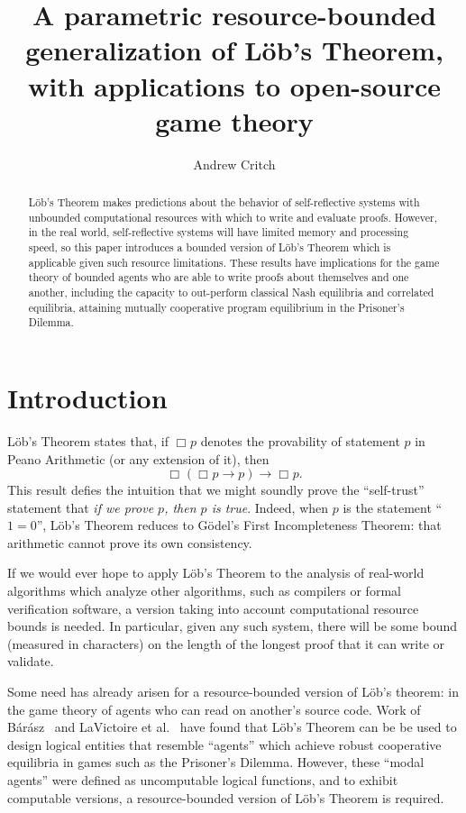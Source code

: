 \documentclass[jsl,reqno,bibay2]{asl}
\title[A parametric resource-bounded generalization of L\"{o}b's Theorem]{A parametric resource-bounded generalization of L\"{o}b's Theorem, with applications to open-source game theory}
\author{Andrew Critch}
\numberwithin{equation}{section}
\theoremstyle{definition}
\newcommand{\bx}[1]{\Box_{#1}}
\renewcommand{\implies}{\rightarrow}
\renewcommand{\-}{^{-1}}
\begin{document}
\begin{abstract}
L\"{o}b's Theorem makes predictions about the behavior of self-reflective systems with unbounded computational resources with which to write and evaluate proofs.  However, in the real world, self-reflective systems will have limited memory and processing speed, so this paper introduces a bounded version of L\"{o}b's Theorem which is applicable given such resource limitations.  
These results have implications for the game theory of bounded agents who are able to write proofs about themselves and one another, including the capacity to out-perform classical Nash equilibria and correlated equilibria, attaining mutually cooperative program equilibrium in the Prisoner's Dilemma.
\end{abstract}

\maketitle

\section{Introduction}\label{sec:bo}

L\"{o}b's Theorem states that, if $\bx{}p$ denotes the provability of statement $p$ in Peano Arithmetic (or any extension of it), then 
\[
\bx{}(\bx{}p \implies p) \implies \bx{}p.
\]
This result defies the intuition that we might soundly prove the ``self-trust'' statement that {\em if we prove $p$, then $p$ is true}.  Indeed, when $p$ is the statement ``$1=0$'', L\"{o}b's Theorem reduces to G\"{o}del's First Incompleteness Theorem: that arithmetic cannot prove its own consistency.

If we would ever hope to apply L\"{o}b's Theorem to the analysis of real-world algorithms which analyze other algorithms, such as compilers or formal verification software, a version taking into account computational resource bounds is needed.  In particular, given any such system, there will be some bound (measured in characters) on the length of the longest proof that it can write or validate.

Some need has already arisen for a resource-bounded version of L\"{o}b's theorem: in the game theory of agents who can read on another's source code.  Work of B\'{a}r\'{a}sz~\citeyear{Barasz:2014:robust} and LaVictoire et al.~\citeyear{LaVictoire:2014:program} have found that L\"{o}b's Theorem can be be used to design logical entities that resemble ``agents'' which achieve robust cooperative equilibria in games such as the Prisoner's Dilemma.  However, these ``modal agents'' were defined as uncomputable logical functions, and to exhibit computable versions, a resource-bounded version of L\"{o}b's Theorem is required.
\end{document}
